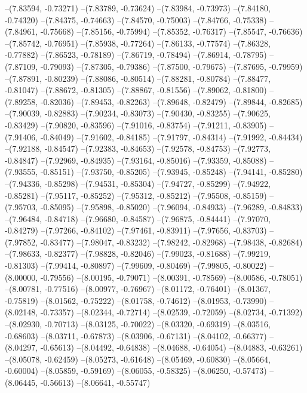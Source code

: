 --(7.83594, -0.73271)
--(7.83789, -0.73624)
--(7.83984, -0.73973)
--(7.84180, -0.74320)
--(7.84375, -0.74663)
--(7.84570, -0.75003)
--(7.84766, -0.75338)
--(7.84961, -0.75668)
--(7.85156, -0.75994)
--(7.85352, -0.76317)
--(7.85547, -0.76636)
--(7.85742, -0.76951)
--(7.85938, -0.77264)
--(7.86133, -0.77574)
--(7.86328, -0.77882)
--(7.86523, -0.78189)
--(7.86719, -0.78494)
--(7.86914, -0.78795)
--(7.87109, -0.79093)
--(7.87305, -0.79386)
--(7.87500, -0.79675)
--(7.87695, -0.79959)
--(7.87891, -0.80239)
--(7.88086, -0.80514)
--(7.88281, -0.80784)
--(7.88477, -0.81047)
--(7.88672, -0.81305)
--(7.88867, -0.81556)
--(7.89062, -0.81800)
--(7.89258, -0.82036)
--(7.89453, -0.82263)
--(7.89648, -0.82479)
--(7.89844, -0.82685)
--(7.90039, -0.82883)
--(7.90234, -0.83073)
--(7.90430, -0.83255)
--(7.90625, -0.83429)
--(7.90820, -0.83596)
--(7.91016, -0.83754)
--(7.91211, -0.83905)
--(7.91406, -0.84049)
--(7.91602, -0.84185)
--(7.91797, -0.84314)
--(7.91992, -0.84434)
--(7.92188, -0.84547)
--(7.92383, -0.84653)
--(7.92578, -0.84753)
--(7.92773, -0.84847)
--(7.92969, -0.84935)
--(7.93164, -0.85016)
--(7.93359, -0.85088)
--(7.93555, -0.85151)
--(7.93750, -0.85205)
--(7.93945, -0.85248)
--(7.94141, -0.85280)
--(7.94336, -0.85298)
--(7.94531, -0.85304)
--(7.94727, -0.85299)
--(7.94922, -0.85281)
--(7.95117, -0.85252)
--(7.95312, -0.85212)
--(7.95508, -0.85159)
--(7.95703, -0.85095)
--(7.95898, -0.85020)
--(7.96094, -0.84933)
--(7.96289, -0.84833)
--(7.96484, -0.84718)
--(7.96680, -0.84587)
--(7.96875, -0.84441)
--(7.97070, -0.84279)
--(7.97266, -0.84102)
--(7.97461, -0.83911)
--(7.97656, -0.83703)
--(7.97852, -0.83477)
--(7.98047, -0.83232)
--(7.98242, -0.82968)
--(7.98438, -0.82684)
--(7.98633, -0.82377)
--(7.98828, -0.82046)
--(7.99023, -0.81688)
--(7.99219, -0.81303)
--(7.99414, -0.80897)
--(7.99609, -0.80469)
--(7.99805, -0.80022)
--(8.00000, -0.79556)
--(8.00195, -0.79071)
--(8.00391, -0.78569)
--(8.00586, -0.78051)
--(8.00781, -0.77516)
--(8.00977, -0.76967)
--(8.01172, -0.76401)
--(8.01367, -0.75819)
--(8.01562, -0.75222)
--(8.01758, -0.74612)
--(8.01953, -0.73990)
--(8.02148, -0.73357)
--(8.02344, -0.72714)
--(8.02539, -0.72059)
--(8.02734, -0.71392)
--(8.02930, -0.70713)
--(8.03125, -0.70022)
--(8.03320, -0.69319)
--(8.03516, -0.68603)
--(8.03711, -0.67873)
--(8.03906, -0.67131)
--(8.04102, -0.66377)
--(8.04297, -0.65613)
--(8.04492, -0.64838)
--(8.04688, -0.64054)
--(8.04883, -0.63261)
--(8.05078, -0.62459)
--(8.05273, -0.61648)
--(8.05469, -0.60830)
--(8.05664, -0.60004)
--(8.05859, -0.59169)
--(8.06055, -0.58325)
--(8.06250, -0.57473)
--(8.06445, -0.56613)
--(8.06641, -0.55747)
